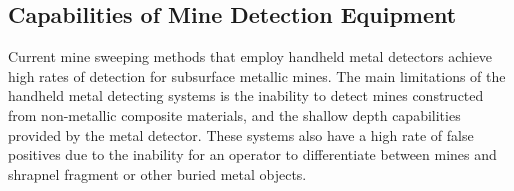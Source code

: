 \documentclass[main.tex]{subfiles}
\begin{document}
\begin{appendices}



\section{Capabilities of Mine Detection Equipment}
Current mine sweeping methods that employ handheld metal detectors achieve high rates of detection for subsurface metallic mines. The main limitations of the handheld metal detecting systems is the inability to detect mines constructed from non-metallic composite materials, and the shallow depth capabilities provided by the metal detector. These systems also have a high rate of false positives due to the inability for an operator to differentiate between mines and shrapnel fragment or other buried metal objects.


\end{appendices}
\end{document}
